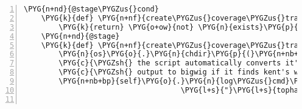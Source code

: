 \begin{Verbatim}[commandchars=\\\{\},numbers=left,firstnumber=1,stepnumber=5]
    \PYG{n+nd}{@stage\PYGZus{}cond}
    \PYG{k}{def} \PYG{n+nf}{create\PYGZus{}coverage\PYGZus{}track}\PYG{p}{(}\PYG{n+nb+bp}{self}\PYG{p}{)}\PYG{p}{:}
        \PYG{k}{return} \PYG{o+ow}{not} \PYG{n}{exists}\PYG{p}{(}\PYG{n}{join}\PYG{p}{(}\PYG{n+nb+bp}{self}\PYG{o}{.}\PYG{n}{analysis}\PYG{o}{.}\PYG{n}{data\PYGZus{}dir}\PYG{p}{,} \PYG{l+s}{"}\PYG{l+s}{coverage.bigwig}\PYG{l+s}{"}\PYG{p}{)}\PYG{p}{)}
    \PYG{n+nd}{@stage}
    \PYG{k}{def} \PYG{n+nf}{create\PYGZus{}coverage\PYGZus{}track}\PYG{p}{(}\PYG{n+nb+bp}{self}\PYG{p}{)}\PYG{p}{:}
        \PYG{n}{os}\PYG{o}{.}\PYG{n}{chdir}\PYG{p}{(}\PYG{n+nb+bp}{self}\PYG{o}{.}\PYG{n}{analysis}\PYG{o}{.}\PYG{n}{data\PYGZus{}dir}\PYG{p}{)}
        \PYG{c}{\PYGZsh{} the script automatically converts it's}
        \PYG{c}{\PYGZsh{} output to bigwig if it finds kent's wigToBigWig}
        \PYG{n+nb+bp}{self}\PYG{o}{.}\PYG{n}{log\PYGZus{}cmd}\PYG{p}{(}\PYG{l+s}{"}\PYG{l+s}{bam\PYGZus{}to\PYGZus{}wiggle.py}\PYG{l+s}{"}\PYG{p}{,} \PYG{l+s}{"}\PYG{l+s}{-o}\PYG{l+s}{"}\PYG{p}{,} \PYG{l+s}{"}\PYG{l+s}{coverage.bigwig}\PYG{l+s}{"}\PYG{p}{,}
                                    \PYG{l+s}{"}\PYG{l+s}{tophat-output/accepted\PYGZus{}hits.bam}\PYG{l+s}{"}\PYG{p}{)}


\end{Verbatim}
